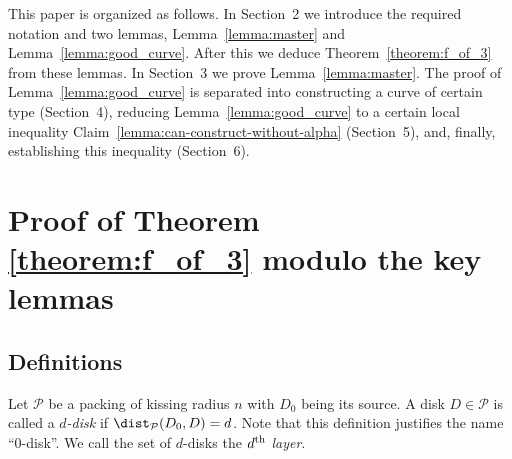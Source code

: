 This paper is organized as follows. In Section~2 we introduce the required notation and two lemmas, Lemma~\ref{lemma:master} and Lemma~\ref{lemma:good_curve}. After this we deduce Theorem~\ref{theorem:f_of_3} from these lemmas. In Section~3 we prove Lemma~\ref{lemma:master}. The proof of Lemma~\ref{lemma:good_curve} is separated into constructing a curve of certain type (Section~4), reducing Lemma~\ref{lemma:good_curve} to a certain local inequality Claim~\ref{lemma:can-construct-without-alpha} (Section~5), and, finally, establishing this inequality (Section~6).


\section{Proof of Theorem \ref{theorem:f_of_3} modulo the key lemmas}



\subsection{Definitions}

Let $\mathcal{P}$ be a packing of kissing radius $n$ with $D_0$ being its source. A disk $D \in \mathcal{P}$ is called a \textit{$d$-disk} if $\dist_{\mathcal{P}}(D_0, D) = d$. Note that this definition justifies the name ``0-disk''. We call the set of $d$-disks the \textit{$d\textsuperscript{th}$ layer}. %

